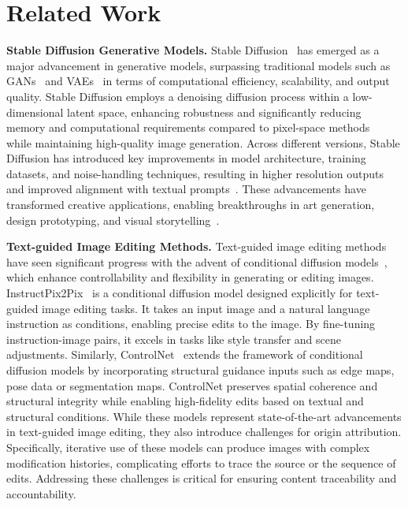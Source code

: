 \section{Related Work}
\label{sec:related}\vspace{-2pt} 
\textbf{Stable Diffusion Generative Models.} Stable Diffusion~\cite{rombach2022high} has emerged as a major advancement in generative models, surpassing traditional models such as GANs~\cite{goodfellow2014generative,radford2015unsupervised,karras2019style} and VAEs~\cite{kingma2013auto,tolstikhin2017wasserstein} in terms of computational efficiency, scalability, and output quality. Stable Diffusion employs a denoising diffusion process within a low-dimensional latent space, enhancing robustness and significantly reducing memory and computational requirements compared to pixel-space methods ~\cite{ho2020denoising,song2020score} while maintaining high-quality image generation. Across different versions, Stable Diffusion has introduced key improvements in model architecture, training datasets, and noise-handling techniques, resulting in higher resolution outputs and improved alignment with textual prompts~\cite{rombach2022high}. These advancements have transformed creative applications, enabling breakthroughs in art generation, design prototyping, and visual storytelling~\cite{han2023design,wu2023not,wang2024diffusion}.

\textbf{Text-guided Image Editing Methods.} Text-guided image editing methods~\cite{li2020manigan,choi2023custom,wang2023imagen,ravi2023preditor} have seen significant progress with the advent of conditional diffusion models~\cite{nichol2021improved,dhariwal2021diffusion}, which enhance controllability and flexibility in generating or editing images. InstructPix2Pix~\cite{brooks2023instructpix2pix} is a conditional diffusion model designed explicitly for text-guided image editing tasks. It takes an input image and a natural language instruction as conditions, enabling precise edits to the image. By fine-tuning instruction-image pairs, it excels in tasks like style transfer and scene adjustments. Similarly, ControlNet~\cite{zhang2023adding,zhao2024uni,li2025controlnet} extends the framework of conditional diffusion models by incorporating structural guidance inputs such as edge maps, pose data or segmentation maps. ControlNet preserves spatial coherence and structural integrity while enabling high-fidelity edits based on textual and structural conditions. While these models represent state-of-the-art advancements in text-guided image editing, they also introduce challenges for origin attribution. Specifically, iterative use of these models can produce images with complex modification histories, complicating efforts to trace the source or the sequence of edits. Addressing these challenges is critical for ensuring content traceability and accountability.

